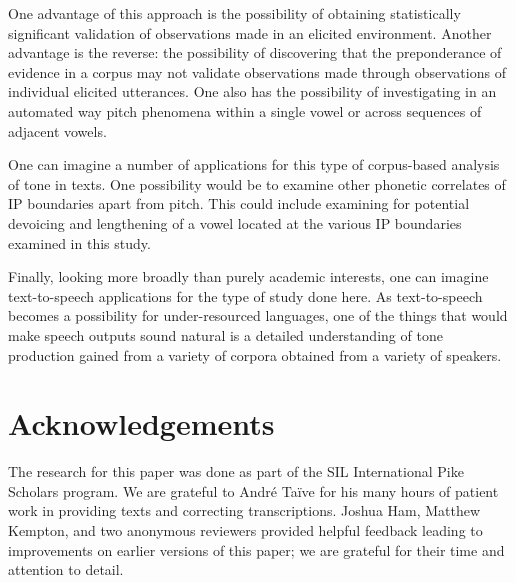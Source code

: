 \documentclass[
  11pt,
  b5paper,
]{article}
\begin{document}
One advantage of this approach is the possibility of obtaining
statistically significant validation of observations made in an elicited
environment. Another advantage is the reverse: the possibility of
discovering that the preponderance of evidence in a corpus may not
validate observations made through observations of individual elicited
utterances. One also has the possibility of investigating in an
automated way pitch phenomena within a single vowel or across sequences
of adjacent vowels.

One can imagine a number of applications for this type of corpus-based
analysis of tone in texts. One possibility would be to examine other
phonetic correlates of IP boundaries apart from pitch. This could
include examining for potential devoicing and lengthening of a vowel
located at the various IP boundaries examined in this study.

Finally, looking more broadly than purely academic interests, one can
imagine text-to-speech applications for the type of study done here. As
text-to-speech becomes a possibility for under-resourced languages, one
of the things that would make speech outputs sound natural is a detailed
understanding of tone production gained from a variety of corpora
obtained from a variety of speakers.

\hypertarget{acknowledgements}{%
\section{Acknowledgements}\label{acknowledgements}}

The research for this paper was done as part of the SIL International
Pike Scholars program. We are grateful to André Taïve for his many hours
of patient work in providing texts and correcting transcriptions. Joshua
Ham, Matthew Kempton, and two anonymous reviewers provided helpful
feedback leading to improvements on earlier versions of this paper; we
are grateful for their time and attention to detail.

\printbibliography[title=References]
\end{document}
